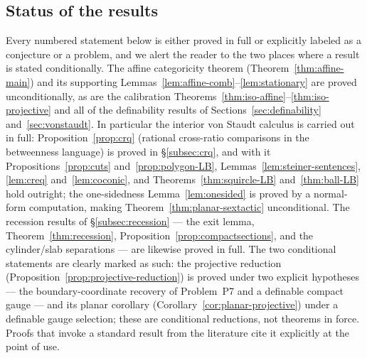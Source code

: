 \documentclass[11pt]{amsart}
\theoremstyle{definition}
\begin{document}
\subsection*{Status of the results}
Every numbered statement below is either proved in full or explicitly labeled
as a conjecture or a problem, and we alert the reader to the two places where a
result is stated conditionally. The affine categoricity theorem
(Theorem~\ref{thm:affine-main}) and its supporting
Lemmas~\ref{lem:affine-comb}--\ref{lem:stationary} are proved unconditionally,
as are the calibration Theorems~\ref{thm:iso-affine}--\ref{thm:iso-projective}
and all of the definability results of Sections~\ref{sec:definability}
and~\ref{sec:vonstaudt}. In particular the interior von Staudt calculus is
carried out in full: Proposition~\ref{prop:crq} (rational cross-ratio
comparisons in the betweenness language) is proved in \S\ref{subsec:crq}, and
with it Propositions~\ref{prop:cuts} and~\ref{prop:polygon-LB},
Lemmas~\ref{lem:steiner-sentences}, \ref{lem:creq} and~\ref{lem:coconic}, and
Theorems~\ref{thm:squircle-LB} and~\ref{thm:ball-LB} hold outright; the
one-sidedness Lemma~\ref{lem:onesided} is proved by a normal-form computation,
making Theorem~\ref{thm:planar-sextactic} unconditional. The recession results
of \S\ref{subsec:recession} --- the exit lemma, Theorem~\ref{thm:recession},
Proposition~\ref{prop:compactsections}, and the cylinder/slab separations ---
are likewise proved in full. The two conditional
statements are clearly marked as such: the projective reduction
(Proposition~\ref{prop:projective-reduction}) is proved under two explicit
hypotheses --- the boundary-coordinate recovery of Problem~P7 and a definable
compact gauge --- and its planar corollary
(Corollary~\ref{cor:planar-projective}) under a definable gauge selection;
these are conditional reductions, not theorems in force. Proofs that invoke a
standard result from the literature cite it explicitly at the point of use.
\end{document}
